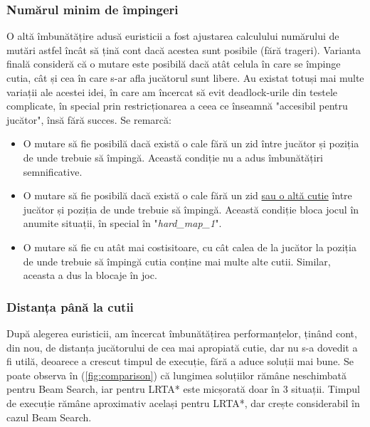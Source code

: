 \documentclass{article}
\begin{document}
\subsubsection{Numărul minim de împingeri}
O altă îmbunătățire adusă euristicii a fost ajustarea calculului numărului de 
mutări astfel încât să țină cont dacă acestea sunt posibile (fără trageri).
Varianta finală consideră că o mutare este posibilă dacă atât celula în care se
împinge cutia, cât și cea în care s-ar afla jucătorul sunt libere. Au existat
totuși mai multe variații ale acestei idei, în care am încercat să evit 
deadlock-urile din testele complicate, în special prin restricționarea a ceea ce 
înseamnă "accesibil pentru jucător", însă fără succes. Se remarcă:
\begin{itemize}
    \item O mutare să fie posibilă dacă există o cale fără un zid între jucător
    și poziția de unde trebuie să împingă. Această condiție nu a adus 
    îmbunătățiri semnificative.
    \item O mutare să fie posibilă dacă există o cale fără un zid 
    \underline{sau o altă cutie} între jucător și poziția de unde trebuie să 
    împingă. Această condiție bloca jocul în anumite situații, în special
    în "\textit{hard\_map\_1}".
    \item O mutare să fie cu atât mai costisitoare, cu cât calea de la jucător 
    la poziția de unde trebuie să împingă cutia conține mai multe alte cutii. 
    Similar, aceasta a dus la blocaje în joc.
\end{itemize}

\subsubsection{Distanța până la cutii}
După alegerea euristicii, am încercat îmbunătățirea performanțelor, ținând 
cont, din nou, de distanța jucătorului de cea mai apropiată cutie, dar nu s-a 
dovedit a fi utilă, deoarece a crescut timpul de execuție, fără a aduce soluții
mai bune. Se poate observa în (\ref{fig:comparison}) că lungimea soluțiilor 
rămâne neschimbată pentru Beam Search, iar pentru LRTA* este micșorată doar în 3
situații. Timpul de execuție rămâne aproximativ același pentru LRTA*, dar crește
considerabil în cazul Beam Search.
\end{document}
